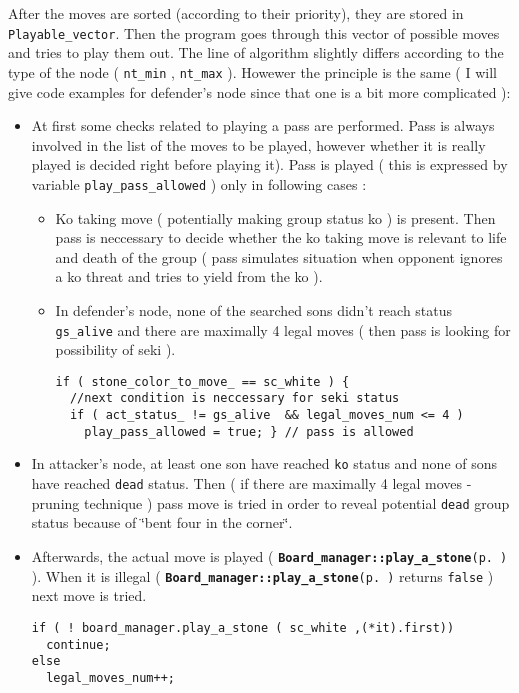 After the moves are sorted (according to their priority), they are stored in {\tt Playable\_\-vector}. Then the program goes through this vector of possible moves and tries to play them out. The line of algorithm slightly differs according to the type of the node ( {\tt nt\_\-min} , {\tt nt\_\-max} ). Howewer the principle is the same ( I will give code examples for defender's node since that one is a bit more complicated ):\begin{itemize}
\item At first some checks related to playing a pass are performed. Pass is always involved in the list of the moves to be played, however whether it is really played is decided right before playing it). Pass is played ( this is expressed by variable {\tt play\_\-pass\_\-allowed} ) only in following cases :\begin{itemize}
\item Ko taking move ( potentially making group status ko ) is present. Then pass is neccessary to decide whether the ko taking move is relevant to life and death of the group ( pass simulates situation when opponent ignores a ko threat and tries to yield from the ko ).\item In defender's node, none of the searched sons didn't reach status {\tt gs\_\-alive} and there are maximally 4 legal moves ( then pass is looking for possibility of seki ). 

\footnotesize\begin{verbatim}if ( stone_color_to_move_ == sc_white ) { 
  //next condition is neccessary for seki status 
  if ( act_status_ != gs_alive  && legal_moves_num <= 4 )
    play_pass_allowed = true; } // pass is allowed
\end{verbatim}
\normalsize
\end{itemize}
\end{itemize}


\begin{itemize}
\item In attacker's node, at least one son have reached {\tt ko} status and none of sons have reached {\tt dead} status. Then ( if there are maximally 4 legal moves - pruning technique ) pass move is tried in order to reveal potential {\tt dead} group status because of \char`\"{}bent four in the corner\char`\"{}.\end{itemize}


\begin{itemize}
\item Afterwards, the actual move is played ( {\tt {\bf Board\_\-manager::play\_\-a\_\-stone}{\rm (p.\,\pageref{classBoard__manager_a4})}} ). When it is illegal ( {\tt {\bf Board\_\-manager::play\_\-a\_\-stone}{\rm (p.\,\pageref{classBoard__manager_a4})}} returns {\tt false} ) next move is tried. 

\footnotesize\begin{verbatim}if ( ! board_manager.play_a_stone ( sc_white ,(*it).first)) 
  continue; 
else
  legal_moves_num++;
\end{verbatim}
\normalsize
\end{itemize}



